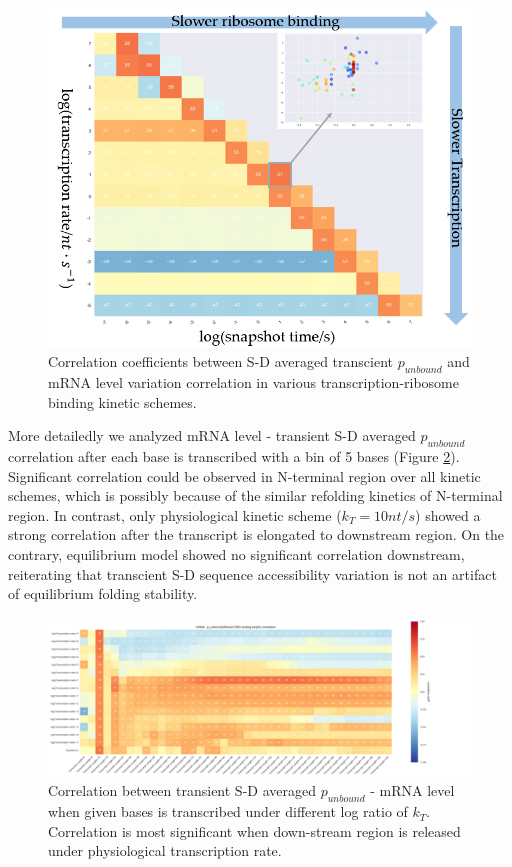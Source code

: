 \documentclass[11pt, a4paper]{article}
\begin{document}
\begin{figure}[htp]
  \centering
  \includegraphics[width=360pt]{timeCorrMatrix.PNG}
  \caption{Correlation coefficients between S-D averaged transcient $p_{unbound}$ and mRNA level variation correlation in various transcription-ribosome binding kinetic schemes.}
  \label{fig:timeCorrMatrix}
\end{figure}

More detailedly we analyzed mRNA level - transient S-D averaged $p_{unbound}$ correlation after each base is transcribed with a bin of 5 bases (Figure \ref{fig:allCorrMatrix}). Significant correlation could be observed in N-terminal region over all kinetic schemes, which is possibly because of the similar refolding kinetics of N-terminal region. In contrast, only physiological kinetic scheme ($k_T=10 nt/s$) showed a strong correlation after the transcript is elongated to downstream region. On the contrary, equilibrium model showed no significant correlation downstream, reiterating that transcient S-D sequence accessibility variation is not an artifact of equilibrium folding stability.

\begin{figure}[htp]
  \includegraphics[width=550pt]{mRNA-p_unbound(transcript_length)correlation_test_n+nc+cterm_SD_5-200_091118.png}
  \caption{Correlation between transient S-D averaged $p_{unbound}$ - mRNA level when given bases is transcribed under different log ratio of $k_T$. Correlation is most significant when down-stream region is released under physiological transcription rate.}
  \label{fig:allCorrMatrix}
\end{figure}
\end{document}
